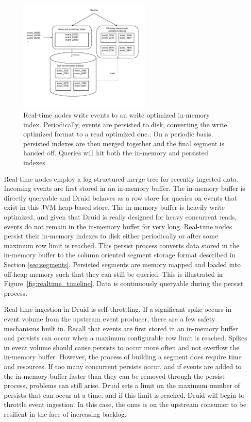 \documentclass{vldb}
\begin{document}
{\begin{figure}
\centering
\includegraphics[width = 2.6in]{realtime_flow} 
\caption{
Real-time nodes write events to an write optimized in-memory index.
Periodically, events are persisted to disk, converting the write optimized
format to a read optimized one.. On a periodic basis, persisted indexes are
then merged together and the final segment is handed off.  Queries will hit
both the in-memory and persisted indexes.  
}
\label{fig:realtime_flow}
\end{figure}

Real-time nodes employ a log structured merge tree\cite{o1996log} for recently
ingested data. Incoming events are first stored in an in-memory buffer. The
in-memory buffer is directly queryable and Druid behaves as a row store for
queries on events that exist in this JVM heap-based store. The in-memory buffer
is heavily write optimized, and given that Druid is really designed for heavy
concurrent reads, events do not remain in the in-memory buffer for very long.
Real-time nodes persist their in-memory indexes to disk either periodically or
after some maximum row limit is reached. This persist process converts data
stored in the in-memory buffer to the column oriented segment storage format
described in Section \ref{sec:segments}.  Persisted segments are memory mapped
and loaded into off-heap memory such that they can still be queried. This is
illustrated in Figure~\ref{fig:realtime_timeline}. Data is continuously
queryable during the persist process.

Real-time ingestion in Druid is self-throttling. If a significant spike occurs
in event volume from the upstream event producer, there are
a few safety mechanisms built in. Recall that events are first stored in an
in-memory buffer and persists can occur when a maximum configurable row limit
is reached. Spikes in event volume should cause persists to occur more often
and not overflow the in-memory buffer. However, the process of building a
segment does require time and resources. If too many concurrent persists occur,
and if events are added to the in-memory buffer faster than they can be removed
through the persist process, problems can still arise. Druid sets a limit on
the maximum number of persists that can occur at a time, and if this limit is
reached, Druid will begin to throttle event ingestion. In this case, the onus
is on the upstream consumer to be resilient in the face of increasing backlog.

}
\end{document}

